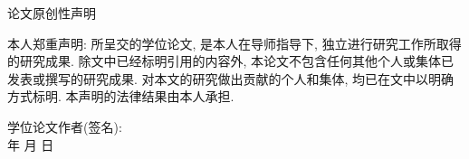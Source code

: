 \newpage
\vspace*{20pt}
\begin{center}{\heiti 论文原创性声明}\end{center}
\par\vspace*{30pt}
\renewcommand{\baselinestretch}{2}
{ \songti %



本人郑重声明: 所呈交的学位论文, 是本人在导师指导下, 独立进行研究工作所取得的研究成果.
除文中已经标明引用的内容外, 本论文不包含任何其他个人或集体已发表或撰写的研究成果.
对本文的研究做出贡献的个人和集体, 均已在文中以明确方式标明.
本声明的法律结果由本人承担. 

\vskip2cm

\hspace*{4cm}学位论文作者(签名): \hspace{4cm} \hfill \\[1cm]
\hspace*{10cm}年 \hfill  月 \hfill 日\hspace{1cm}\hfill\par}

  \iflib
  \else
  \newpage
  \thispagestyle{empty}
  \cleardoublepage
  \fi
\renewcommand{\baselinestretch}{1.6}
\small\normalsize
